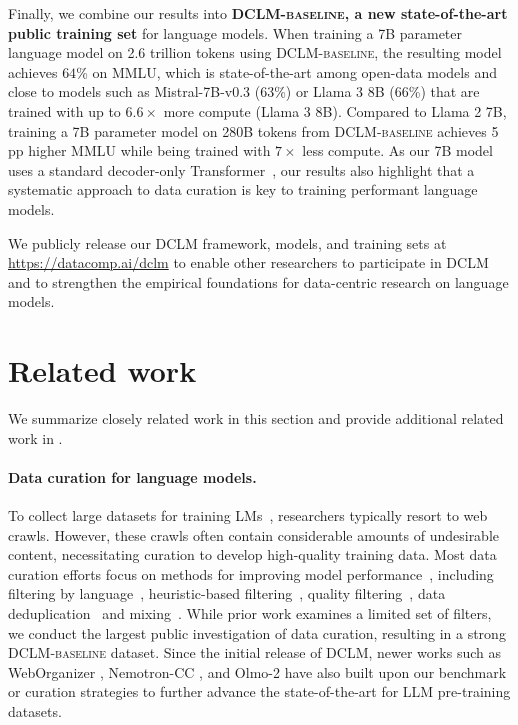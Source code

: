 \documentclass{article}
\newcommand{\smallsec}[1]{\paragraph{#1}}
\newcommand{\dclm}{\textsc{DCLM}\xspace}
\newcommand{\bestmmlu}{$64$\xspace}
\newcommand{\hqpool}{\textsc{DCLM-baseline}\xspace}
\newcommand{\ourcode}{\url{https://datacomp.ai/dclm}\xspace}  %
\newcommand{\llama}{Llama\xspace}
\begin{document}
Finally, we combine our results into \textbf{\hqpool, a new state-of-the-art public training set} for language models.
When training a 7B parameter language model on 2.6 trillion tokens using \hqpool, the resulting model achieves \bestmmlu{}\% on MMLU, which is state-of-the-art among open-data models and close to models such as Mistral-7B-v0.3 (63\%) or \llama 3 8B (66\%) that are trained with up to $6.6\times$ more compute (\llama 3 8B).
Compared to \llama 2 7B, training a 7B parameter model on 280B tokens from \hqpool achieves 5 pp higher MMLU while being trained with $7 \times$ less compute.
As our 7B model uses a standard decoder-only Transformer~\citep{transformer,Radford2019LanguageMA,llama}, our results also highlight that a systematic approach to data curation is key to training performant language models.

We publicly release our \dclm framework, models, and training sets at \ourcode to enable other researchers to participate in \dclm and to strengthen the empirical foundations for data-centric research on language models.


\section{Related work}
\label{sec:related}

We summarize closely related work in this section and provide additional related work in .

\smallsec{Data curation for language models.}
To collect large datasets for training LMs~\citep{gpt3}, researchers typically resort to web crawls. However, these crawls often contain considerable amounts of undesirable content, necessitating curation to develop high-quality training data.
Most data curation efforts focus on methods for improving model performance~\citep{raffel2020exploring, gpt3, wenzek-etal-2020-ccnet, gopher, refinedweb, soldaini2024dolma}, including
filtering by language~\citep{NEURIPS2019_c04c19c2, raffel2020exploring, xue-etal-2021-mt5, NEURIPS2022_ce9e92e3}, heuristic-based filtering~\citep{pile, gopher, refinedweb, Chen2021EvaluatingLL, soldaini2024dolma}, quality filtering~\citep{wenzek-etal-2020-ccnet,du2022glam, longpre2023pretrainers, xie2023data,sachdeva2024train},
data deduplication~\citep{10.1145/1645953.1646283,Lee2021DeduplicatingTD} and mixing~\citep{xie2023doremi, cerebras2023slimpajama, albalak2023efficient}.
While prior work examines a limited set of filters, we conduct the largest public investigation of data curation, resulting in a strong \hqpool{} dataset. Since the initial release of DCLM, newer works such as WebOrganizer \citep{wettig2025organize}, Nemotron-CC \citep{su2024nemotroncc}, and Olmo-2 \citep{olmo20252olmo2furious} have also built upon our benchmark or curation strategies to further advance the state-of-the-art for LLM pre-training datasets.
\end{document}
